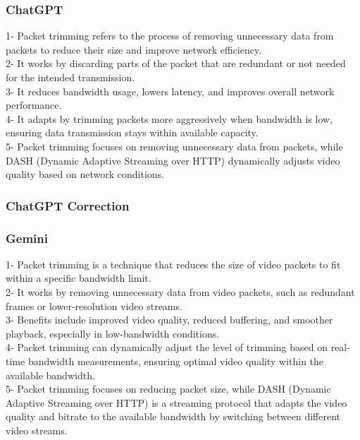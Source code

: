 \subsubsection{ChatGPT}
\begin{tcolorbox}[breakable]
    1- Packet trimming refers to the process of removing unnecessary data from packets to reduce their size and improve network efficiency.\\
2- It works by discarding parts of the packet that are redundant or not needed for the intended transmission.\\
3- It reduces bandwidth usage, lowers latency, and improves overall network performance.\\
4- It adapts by trimming packets more aggressively when bandwidth is low, ensuring data transmission stays within available capacity.\\
5- Packet trimming focuses on removing unnecessary data from packets, while DASH (Dynamic Adaptive Streaming over HTTP) dynamically adjusts video quality based on network conditions.\\

\end{tcolorbox}
\subsubsection{ChatGPT Correction}
\begin{tcolorbox}[breakable]
    
\end{tcolorbox}
\subsubsection{Gemini}
\begin{tcolorbox}[breakable]
1- Packet trimming is a technique that reduces the size of video packets to fit within a specific bandwidth limit.\\
2- It works by removing unnecessary data from video packets, such as redundant frames or lower-resolution video streams.\\
3- Benefits include improved video quality, reduced buffering, and smoother playback, especially in low-bandwidth conditions.\\
4- Packet trimming can dynamically adjust the level of trimming based on real-time bandwidth measurements, ensuring optimal video quality within the available bandwidth.\\
5- Packet trimming focuses on reducing packet size, while DASH (Dynamic Adaptive Streaming over HTTP) is a streaming protocol that adapts the video quality and bitrate to the available bandwidth by switching between different video streams.\\
\end{tcolorbox}
